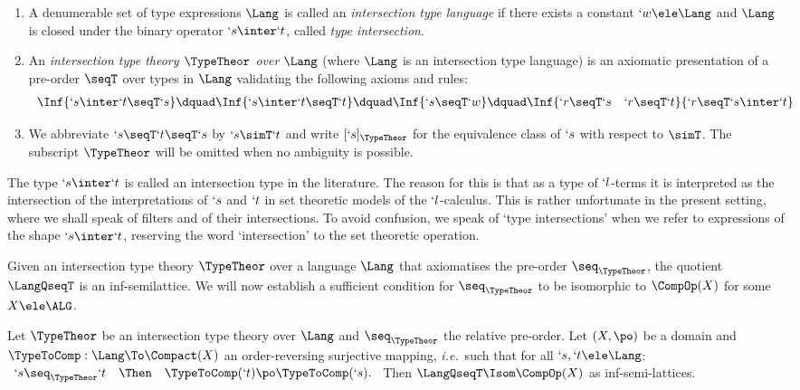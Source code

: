 \documentclass{CSML}
\def\ie{\emph{i.e.}}
\begin{document}
 \begin{defi} \label{def:interLangTheory}\hfill
 \begin{enumerate}
 \item 
A denumerable set of type expressions $\Lang$ is called an \emph{intersection type language} if there exists a constant $`w \ele \Lang$ and $\Lang$ is closed under the binary operator $`s\inter`t $, called \emph{type intersection}.

 \item 
An \emph{intersection type theory $\TypeTheor$ over $\Lang$} (where $\Lang$ is an intersection type language) is an axiomatic presentation of a pre-order $\seqT$ over %
types in $\Lang$ validating the following axioms and rules:
%
 \[ \begin{array}{c@{\dquad}c@{\dquad}c@{\dquad}c}
	\Inf {`s \inter `t \seqT `s } &
	\Inf {`s \inter `t \seqT `t } &
	\Inf {`s \seqT `w } &
	\Inf {`r \seqT `s \quad `r \seqT `t }{ `r \seqT `s \inter `t }
	\end{array} \]

 \item
We abbreviate $`s\seqT`t\seqT`s$ by $`s \simT`t$ and write $[`s]_{\TypeTheor}$ for the equivalence class of $`s$ with respect to $\simT$. The subscript ${\TypeTheor}$ will be omitted when no ambiguity is possible.

 \end{enumerate}
 \end{defi}

\noindent The type $`s\inter`t$ is called an intersection type in the literature. 
The reason for this is that as a type of $`l$-terms it is interpreted as the intersection of the interpretations of $`s$ and $`t$ in set theoretic models of the $`l$-calculus. 
This is rather unfortunate in the present setting, where we shall speak of filters and of their intersections. 
To avoid confusion, we speak of `type intersections' when we refer to expressions of the shape $`s\inter`t$, reserving the word `intersection' to the set theoretic operation.

Given an intersection type theory $\TypeTheor$ over a language $\Lang$ that axiomatises the pre-order $\seq_{\TypeTheor}$, the quotient $\LangQseqT$ is an inf-semilattice. 
We will now establish a sufficient condition for $\seq_{\TypeTheor}$ to be isomorphic to $\CompOp(X)$ for some $X \ele \ALG$.

 \begin{lem} \label{lem:compactRep}
Let $ \TypeTheor$ be an intersection type theory over $\Lang$ and $\seq_{\TypeTheor}$ the relative pre-order. 
Let $(X,\po)$ be a domain and $ \TypeToComp: \Lang \To \Compact(X) $ an order-reversing surjective mapping, \ie~such that for all $`s,`t \ele \Lang$:
%
 $ \begin{array}{rcl}
`s \seq_{\TypeTheor} `t &\Then& \TypeToComp(`t) \po \TypeToComp(`s). 
 \end{array} $
Then $\LangQseqT \Isom \CompOp(X)$ as inf-semi-lattices.
 \end{lem}
\end{document}
